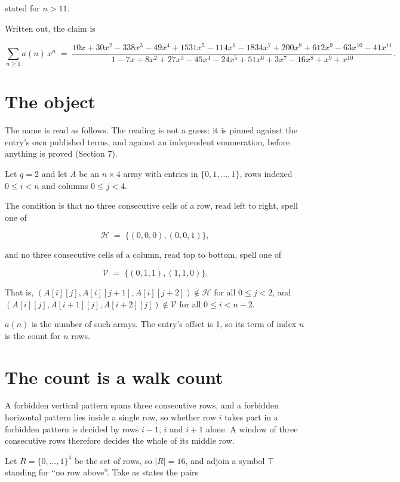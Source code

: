 \documentclass[11pt]{article}
\theoremstyle{definition}
\begin{document}
stated for $n > 11$.

Written out, the claim is

\[\sum_{n \ge 1} a(n)\,x^n \;=\; \frac{10x + 30x^{2} - 338x^{3} - 49x^{4} + 1531x^{5} - 114x^{6} - 1834x^{7} + 200x^{8} + 612x^{9} - 63x^{10} - 41x^{11}}{1 - 7x + 8x^{2} + 27x^{3} - 45x^{4} - 24x^{5} + 51x^{6} + 3x^{7} - 16x^{8} + x^{9} + x^{10}}.\]

\section{The object}

The name is read as follows. The reading is not a guess: it is pinned against the entry's own published terms, and against an independent enumeration, before anything is proved (Section 7).

Let $q = 2$ and let $A$ be an $n \times 4$ array with entries in $\{0,1,\dots,1\}$, rows indexed $0 \le i < n$ and columns $0 \le j < 4$.

The condition is that no three consecutive cells of a row, read left to right, spell one of

\[\mathcal{H} \;=\; \{(0,0,0), (0,0,1)\},\]

and no three consecutive cells of a column, read top to bottom, spell one of

\[\mathcal{V} \;=\; \{(0,1,1), (1,1,0)\}.\]

That is, $(A[i][j],A[i][j{+}1],A[i][j{+}2]) \notin \mathcal{H}$ for all $0 \le j < 2$, and $(A[i][j],A[i{+}1][j],A[i{+}2][j]) \notin \mathcal{V}$ for all $0 \le i < n-2$.

$a(n)$ is the number of such arrays. The entry's offset is 1, so its term of index $n$ is the count for $n$ rows.

\section{The count is a walk count}

A forbidden vertical pattern spans three consecutive rows, and a forbidden horizontal pattern lies inside a single row, so whether row $i$ takes part in a forbidden pattern is decided by rows $i-1$, $i$ and $i+1$ alone. A window of three consecutive rows therefore decides the whole of its middle row.

Let $R = \{0,\dots,1\}^{4}$ be the set of rows, so $|R| = 16$, and adjoin a symbol $\top$ standing for ``no row above''. Take as states the pairs
\end{document}
